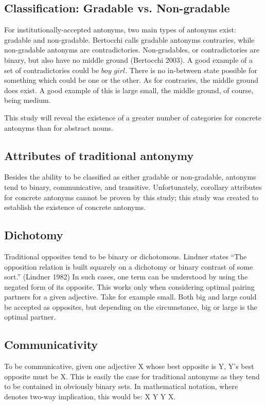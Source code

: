 \subsection {Classification: Gradable vs. Non-gradable} For institutionally-accepted antonyms, two main types of antonyms exist: gradable and non-gradable. Bertocchi calls gradable antonyms contraries, while non-gradable antonyms are contradictories.   Non-gradables, or contradictories are binary, but also have no middle ground (Bertocchi 2003).  A good example of a set of contradictories could be $boy$ \opp $girl$.  There is no in-between state possible for something which could be one or the other.  As for contraries, the middle ground does exist.  A good example of this is large \opp small, the middle ground, of course, being medium.  

This study will reveal the existence of a greater number of categories for concrete antonyms than for abstract nouns. 

\subsection {Attributes of traditional antonymy} Besides the ability to be classified as either gradable or non-gradable, antonyms tend to binary, communicative, and transitive.  Unfortunately, corollary attributes for concrete antonyms cannot be proven by this study; this study was created to establish the existence of concrete antonyms.

\subsection {Dichotomy} Traditional opposites tend to be binary or dichotomous.  Lindner states “The opposition relation is built squarely on a dichotomy or binary contrast of some sort.” (Lindner 1982) In such cases, one term can be understood by using the negated form of its opposite.  This works only when considering optimal pairing partners for a given adjective.  Take for example small.  Both big and large could be accepted as opposites, but depending on the circumstance, big or large is the optimal partner.

\subsection {Communicativity} To be communicative, given one adjective X whose best opposite is Y, Y’s best opposite must be X.  This is easily the case for traditional antonyms as they tend to be contained in obviously binary sets. In mathematical notation, where  denotes two-way implication, this would be: X \opp Y  Y \opp X.

